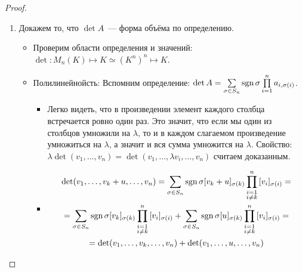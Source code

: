 \begin{proof}\leavevmode
    \begin{enumerate}
        \item 
            Докажем то, что $\det A$~--- форма объёма по определению.

            \begin{itemize}
                \item Проверим области определения и значений: $\det\colon M_n(K)\mapsto K \simeq (K^n)^n \mapsto K$.
                \item Полилинейнойсть:
                    Вспомним определение: 
                    $\det A = \sum\limits_{\sigma\in S_n} {\operatorname{sgn}\sigma \prod\limits_{i = 1}^{n}{a_{i, \sigma(i)}}}$. 
                    \begin{itemize}
                        \item 
                            Легко видеть, что в произведении элемент каждого столбца встречается ровно один раз.
                            Это значит, что если мы один из столбцов умножили на $\lambda$, то и в каждом слагаемом
                            произведение умножиться на $\lambda$, а значит и вся сумма умножится на $\lambda$. 
                            Свойство: $\lambda \det (v_1,\dots, v_n) = \det (v_1, \dots, \lambda v_i, \dots, v_n)$
                            считаем доказанным.
                        \item
                            \[
                            \begin{gathered}
                                \det (v_1,\dots, v_k + u, \dots, v_n) = 
                                \sum\limits_{\sigma\in S_n} {\operatorname{sgn}\sigma[v_k + u]_{\sigma(k)} \prod\limits_{\substack{i = 1\\i\not=k}}^{n}{[v_i]_{\sigma(i)}}}=\\=
                                \sum\limits_{\sigma\in S_n} {\operatorname{sgn}\sigma[v_k]_{\sigma(k)} \prod\limits_{\substack{i = 1\\i\not=k}}^{n}{[v_i]_{\sigma(i)}}}+
                                \sum\limits_{\sigma\in S_n} {\operatorname{sgn}\sigma[u]_{\sigma(k)} \prod\limits_{\substack{i = 1\\i\not=k}}^{n}{[v_i]_{\sigma(i)}}}=\\=
                                \det (v_1,\dots, v_k, \dots, v_n) + 
                                \det (v_1,\dots, u, \dots, v_n) 
                            \end{gathered}
                            \] 
                    \end{itemize}

\end{itemize}
\end{enumerate}
\end{proof}
